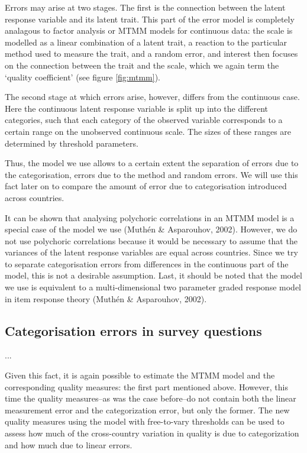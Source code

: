 \documentclass[a4paper,12pt]{article}
\begin{document}
Errors may arise at two stages. The first is the connection between the latent response variable and its latent trait. This part of the error model is completely analagous to factor analysis or MTMM models for continuous data: the scale is modelled as a linear combination of a latent trait, a reaction to the particular method used to measure the trait, and a random error, and interest then focuses on the connection between the trait and the scale, which we again term the `quality coefficient' (see figure \ref{fig:mtmm}). 

The second stage at which errors arise, however, differs from the continuous case. Here the continuous latent response variable is split up into the different categories, such that each category of the observed variable corresponds to a certain range on the unobserved continuous scale. The sizes of these ranges are determined by threshold parameters.

Thus, the model we use allows to a certain extent the separation of errors due to the categorisation, errors due to the method and random errors. We will use this fact later on to compare the amount of error due to categorisation introduced across countries.

It can be shown that analysing polychoric correlations in an MTMM model is a special case of the model we use (Muth\'{e}n \& Asparouhov, 2002). However, we do not use polychoric correlations because it would be  necessary to assume that the variances of the latent response variables are equal across countries. Since we try to separate categorisation errors from differences in the continuous part of the model, this is not a desirable assumption. Last, it should be noted that the model we use is equivalent to a multi-dimensional two parameter graded response model in item response theory (Muth\'{e}n \& Asparouhov, 2002).

\subsection{Categorisation errors in survey questions}

...

Given this fact, it is again possible to estimate the MTMM model and the corresponding quality measures: the first part mentioned above. However, this time the quality measures--as was the case before--do not contain both the linear measurement error and the categorization error, but only the former. The new quality measures using the model with free-to-vary thresholds can be used to assess how much of the cross-country variation in quality is due to categorization and how much due to linear errors.
\end{document}
